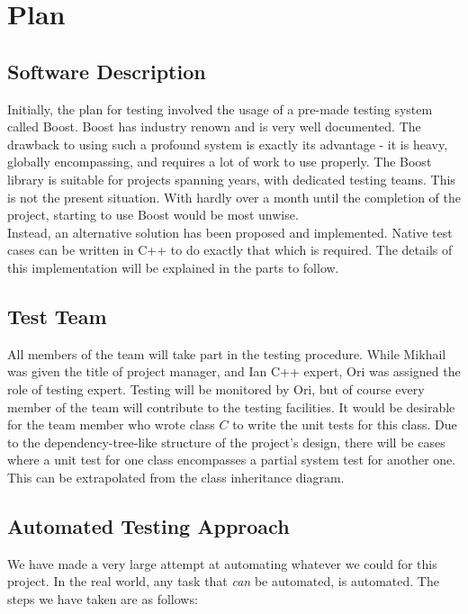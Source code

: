 \documentclass[12pt, titlepage]{article}
\begin{document}
\newpage
\section{Plan}
\label{section2}
		
	\subsection{Software Description}

	Initially, the plan for testing involved the usage of a pre-made testing system called Boost. Boost has industry renown and is very well documented. The drawback to using such a profound system is exactly its advantage - it is heavy, globally encompassing, and requires a lot of work to use properly. The Boost library is suitable for projects spanning years, with dedicated testing teams. This is not the present situation. With hardly over a month until the completion of the project, starting to use Boost would be most unwise.\\

	Instead, an alternative solution has been proposed and implemented. Native test cases can be written in C++ to do exactly that which is required. The details of this implementation will be explained in the parts to follow.

	\subsection{Test Team}

	All members of the team will take part in the testing procedure. While Mikhail was given the title of project manager, and Ian C++ expert, Ori was assigned the role of testing expert. Testing will be monitored by Ori, but of course every member of the team will contribute to the testing facilities. It would be desirable for the team member who wrote class $C$ to write the unit tests for this class. Due to the dependency-tree-like structure of the project's design, there will be cases where a unit test for one class encompasses a partial system test for another one. This can be extrapolated from the class inheritance diagram.

	\subsection{Automated Testing Approach}

	We have made a very large attempt at automating whatever we could for this project. In the real world, any task that \textit{can} be automated, is automated. The steps we have taken are as follows:
\end{document}
